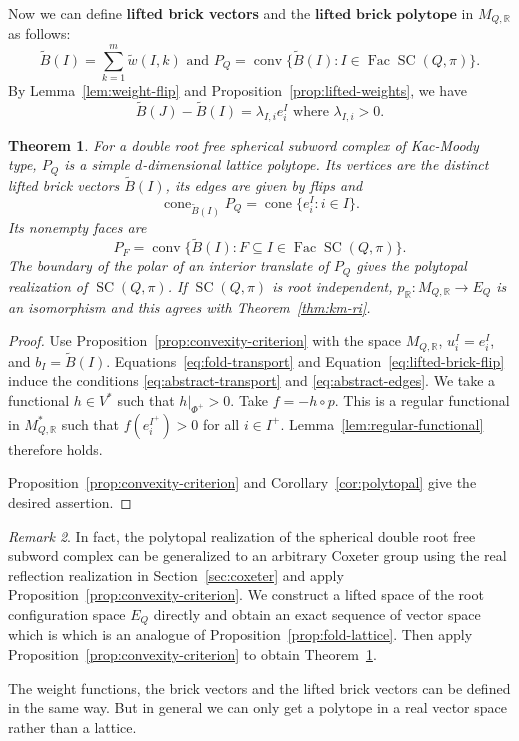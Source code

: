 \documentclass[11pt,a4paper]{article}
\newtheorem{theorem}{Theorem}[section]
\theoremstyle{definition}
\theoremstyle{remark}
\newtheorem{remark}[theorem]{Remark}
\newcommand{\R}{\mathbb R}
\newcommand{\SC}{\operatorname{SC}}
\newcommand{\cone}{\operatorname{cone}}
\newcommand{\conv}{\operatorname{conv}}
\newcommand{\Fac}{\operatorname{Fac}}
\numberwithin{equation}{section}
\newcommand{\wt}{\widetilde}
\begin{document}
Now we can define \textbf{lifted brick vectors} and the $\textbf{lifted brick polytope}$ in $M_{Q,\R}$ as follows:
\begin{equation}\label{eq:lifted-brick}
\wt B(I)=\sum_{k=1}^m\wt w(I,k) \text{ and } P_Q=\conv\{\wt B(I):I\in\Fac\SC (Q,\pi)\}.
\end{equation}
By Lemma~\ref{lem:weight-flip} and Proposition~\ref{prop:lifted-weights}, we have
\begin{equation}\label{eq:lifted-brick-flip}
\wt B(J)-\wt B(I)=\lambda_{I,i}e_i^I \text{ where } \lambda_{I,i}>0.
\end{equation}

\begin{theorem}\label{thm:drf-polytope}
For a double root free spherical subword complex of Kac-Moody type, $P_Q$ is a simple $d$-dimensional lattice
polytope. Its vertices are the distinct lifted brick vectors $\wt B(I)$, its edges are given by flips and
\begin{equation}\label{eq:lifted-tangent}
\cone_{\wt B(I)}P_Q=\cone\{e_i^I:i\in I\}.
\end{equation}
Its nonempty faces are
\[
P_F=\conv\{\wt B(I):F\subseteq I\in\Fac\SC (Q,\pi)\}.
\]
The boundary of the polar of an interior translate of $P_Q$ gives the polytopal realization of $\SC (Q,\pi)$. If $\SC (Q,\pi)$ is root independent, $p_{\R}:M_{Q,\R}\to E_Q$ is an isomorphism and this agrees with Theorem~\ref{thm:km-ri}.
\end{theorem}
\begin{proof}
Use Proposition~\ref{prop:convexity-criterion} with the space $M_{Q,\R}$, $u_i^I=e_i^I$, and $b_I=\wt B(I)$. Equations~\eqref{eq:fold-transport} and Equation~\eqref{eq:lifted-brick-flip} induce the conditions \eqref{eq:abstract-transport} and \eqref{eq:abstract-edges}. We take a functional $h\in V_{}^*$ such that $h|_{\Phi^+}>0$. Take $f=-h\circ p$. This is a regular functional in $M_{Q,\R}^*$ such that $f(e^{I^+}_i)>0$ for all $i\in I^+$. Lemma~\ref{lem:regular-functional} therefore holds.

Proposition~\ref{prop:convexity-criterion} and Corollary~\ref{cor:polytopal} give the desired assertion. 
\end{proof}

\begin{remark}\label{rem:general-Coxeter}
In fact, the polytopal realization of the spherical double root free subword complex can be generalized to an arbitrary Coxeter group using the real reflection realization in Section~\ref{sec:coxeter} and apply Proposition~\ref{prop:convexity-criterion}. We construct a lifted space of the root configuration space $E_Q$ directly and obtain an exact sequence of vector space which is which is an analogue of Proposition~\ref{prop:fold-lattice}. Then apply Proposition~\ref{prop:convexity-criterion} to obtain Theorem~\ref{thm:drf-polytope}.

The weight functions, the brick vectors and the lifted brick vectors can be defined in the same way. But in general we can only get a polytope in a real vector space rather than a lattice. 
\end{remark}
\end{document}
